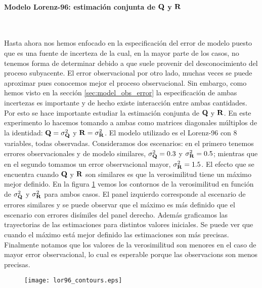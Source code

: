 \clearpage

\paragraph{Modelo Lorenz-96: estimación conjunta de $\mathbf{Q}$ y $\mathbf{R}$} \

Hasta ahora nos hemos enfocado en la especificación del error de modelo puesto que es una fuente de incerteza de la cual, en la mayor parte de los casos, no tenemos forma de determinar debido a que suele provenir del desconocimiento del proceso subyacente. El error observacional por otro lado, muchas veces se puede aproximar pues conocemos mejor el proceso observacional. Sin embargo, como hemos visto en la sección \ref{sec:model_obs_error} la especificación de ambas incertezas es importante y de hecho existe interacción entre ambas cantidades. Por esto se hace importante estudiar la estimación conjunta de $\mathbf{Q}$ y $\mathbf{R}$. En este experimento lo hacemos tomando a ambas como matrices diagonales múltiplos de la identidad: $\mathbf{Q} = \sigma_{\mathbf{Q}}^2$ y $\mathbf{R} = \sigma_{\mathbf{R}}^2$. El modelo utilizado es el Lorenz-96 con 8 variables, todas observadas. Consideramos dos escenarios: en el primero tenemos errores observacionales y de modelo similares, $\sigma_{\mathbf{Q}}^2 = 0.3$ y $\sigma_{\mathbf{R}}^2 = 0.5$; mientras que en el segundo tomamos un error observacional mayor, $\sigma_{\mathbf{R}}^2 = 1.5$. El efecto que se encuentra cuando $\mathbf{Q}$ y $\mathbf{R}$ son similares es que la verosimilitud tiene un máximo mejor definido. En la figura \ref{fig:lor96_contours} vemos los contornos de la verosimilitud en función de $\sigma_{\mathbf{Q}}^2$ y $\sigma_{\mathbf{R}}^2$ para ambos casos. El panel izquierdo corresponde al escenario de errores similares y se puede observar que el máximo es más definido que el escenario con errores disímiles del panel derecho. Además graficamos las trayectorias de las estimaciones para distintos valores iniciales. Se puede ver que cuando el máximo está mejor definido las estimaciones son más precisas. Finalmente notamos que los valores de la verosimilitud son menores en el caso de mayor error observacional, lo cual es esperable porque las observacions son menos precisas.

\begin{figure}[h]
    \centering
    \texttt{[image: lor96\_contours.eps]}
    \caption{}
    \label{fig:lor96_contours}
\end{figure}
